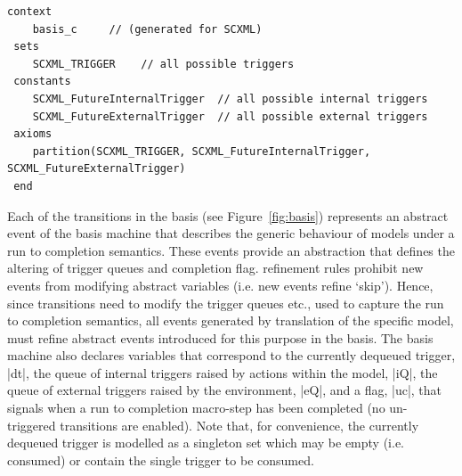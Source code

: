  \begin{lstlisting}[caption={Abstract basis context},label={lst:BasisContext}, language=Event-B, escapechar=|, frame=single, basicstyle=\rmfamily\scriptsize, belowskip=-2.0 \baselineskip, float=t]
 context
 	basis_c 	// (generated for SCXML)
 sets
 	SCXML_TRIGGER	 // all possible triggers
 constants
 	SCXML_FutureInternalTrigger	 // all possible internal triggers
 	SCXML_FutureExternalTrigger	 // all possible external triggers  
 axioms
 	partition(SCXML_TRIGGER, SCXML_FutureInternalTrigger, SCXML_FutureExternalTrigger) 
 end
 \end{lstlisting}	
 


Each of the transitions in the basis (see Figure~\ref{fig:basis}) represents an abstract event of the basis machine that describes the generic behaviour of models under a run to completion semantics.
These events provide an abstraction that defines the altering of trigger queues and completion flag. 
\EventB refinement rules prohibit new events from modifying abstract variables (i.e. new events refine `skip').
Hence, since \SCXML transitions need to modify the trigger queues etc., used to capture the \SCXML run to completion semantics, all events generated by translation of the specific \SCXML model,  must refine abstract events introduced for this purpose in the basis.
The basis machine also declares variables that correspond to the currently dequeued trigger,  |dt|, 
the queue of internal triggers raised by actions within the model, |iQ|, 
the queue of external triggers raised by the environment, |eQ|,
and a flag, |uc|, that signals when a run to completion macro-step has been completed 
(no un-triggered transitions are enabled). 
Note that, for convenience, the currently dequeued trigger is modelled as a singleton set which may be empty (i.e. consumed) or contain the single trigger to be consumed.

